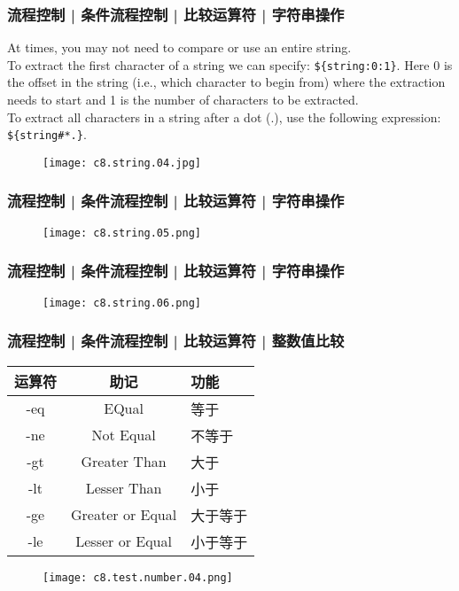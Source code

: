 \begin{frame}[fragile]
  \frametitle{流程控制 | 条件流程控制 | 比较运算符 | 字符串操作}
  At times, you may not need to compare or use an entire string.\\
  \vspace{0.2cm}
  To extract the first character of a string we can specify: \verb|${string:0:1}|. Here 0 is the offset in the string (i.e., which character to begin from) where the extraction needs to start and 1 is the number of characters to be extracted.\\
  \vspace{0.2cm}
  To extract all characters in a string after a dot (.), use the following expression: \verb|${string#*.}|.
  \begin{figure}
    \centering
    \texttt{[image: c8.string.04.jpg]}
  \end{figure}
\end{frame}

\begin{frame}
  \frametitle{流程控制 | 条件流程控制 | 比较运算符 | 字符串操作}
  \begin{figure}
    \centering
    \texttt{[image: c8.string.05.png]}
  \end{figure}
\end{frame}

\begin{frame}
  \frametitle{流程控制 | 条件流程控制 | 比较运算符 | 字符串操作}
  \begin{figure}
    \centering
    \texttt{[image: c8.string.06.png]}
  \end{figure}
\end{frame}

\begin{frame}
  \frametitle{流程控制 | 条件流程控制 | 比较运算符 | \alert{整数值比较}}
  \begin{table}
    \centering
    \begin{tabularx}{0.7\textwidth}{ccX}
      \hline
      \rowcolor{blue!50}运算符 & 助记 & 功能\\
      \hline
      -eq & EQual & 等于\\
      -ne & Not Equal & 不等于\\
      -gt & Greater Than & 大于\\
      -lt & Lesser Than & 小于\\
      -ge & Greater or Equal & 大于等于\\
      -le & Lesser or Equal & 小于等于\\
      \hline
    \end{tabularx}
  \end{table}
  \begin{figure}
    \centering
    \texttt{[image: c8.test.number.04.png]}
  \end{figure}
\end{frame}

